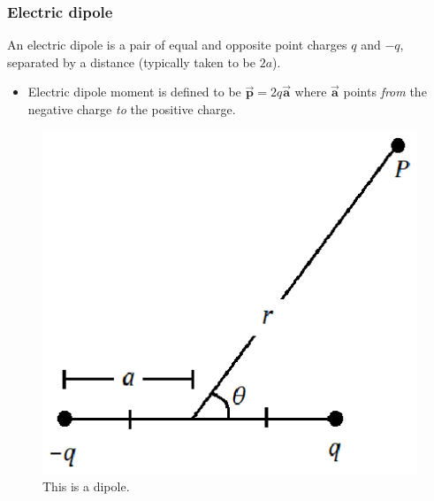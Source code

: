 \documentclass{scrartcl}
\begin{document}
    \subsubsection{Electric dipole}
    An electric dipole is a pair of equal and opposite point charges $q$ and $-q$, separated by a distance (typically taken to be $2a$).
    \begin{itemize}
        \item Electric dipole moment is defined to be $\boxed{\vec{\mathbf p}=2q\vec{\mathbf a}}$ where $\vec{\mathbf a}$ points \textit{from} the negative charge \textit{to} the positive charge.
    \end{itemize}
    \begin{figure}[H]
        \centering
        \begin{minipage}[b]{.4\textwidth}
            \includegraphics[width=\textwidth]{dipole.eps}
            \caption{This is a dipole.}
        \end{minipage}
    \end{figure}
\end{document}
